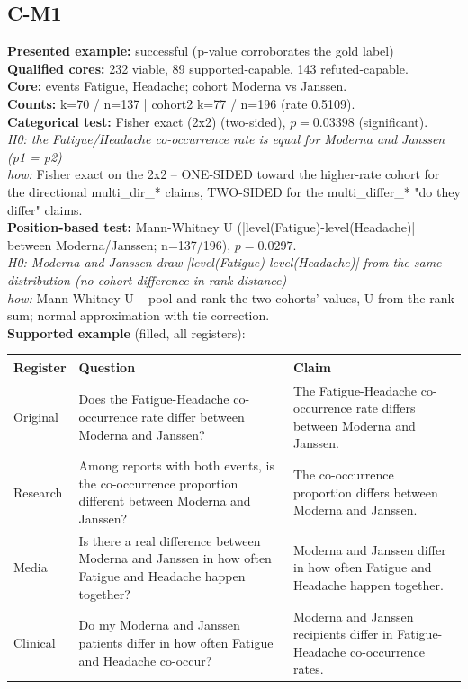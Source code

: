 \documentclass[11pt]{article}
\begin{document}
\subsection*{C-M1}
\textbf{Presented example:} successful (p-value corroborates the gold label) \\
\textbf{Qualified cores:} 232 viable, 89 supported-capable, 143 refuted-capable. \\
\textbf{Core:} events Fatigue, Headache; cohort Moderna vs Janssen. \\
\textbf{Counts:} k=70 / n=137  |  cohort2 k=77 / n=196  (rate 0.5109). \\
\textbf{Categorical test:} Fisher exact (2x2) (two-sided), $p = 0.03398$ (significant). \\
\emph{H0: the Fatigue/Headache co-occurrence rate is equal for Moderna and Janssen (p1 = p2)} \\
\emph{how:} Fisher exact on the 2x2 -- ONE-SIDED toward the higher-rate cohort for the directional multi\_dir\_* claims, TWO-SIDED for the multi\_differ\_* "do they differ" claims. \\
\textbf{Position-based test:} Mann-Whitney U (|level(Fatigue)-level(Headache)| between Moderna/Janssen; n=137/196), $p = 0.0297$. \\
\emph{H0: Moderna and Janssen draw |level(Fatigue)-level(Headache)| from the same distribution (no cohort difference in rank-distance)} \\
\emph{how:} Mann-Whitney U -- pool and rank the two cohorts' values, U from the rank-sum; normal approximation with tie correction. \\
\textbf{Supported example} (filled, all registers): \\
\begin{tabularx}{\linewidth}{@{}l L L@{}}
\toprule
\textbf{Register} & \textbf{Question} & \textbf{Claim} \\
\midrule
Original & Does the Fatigue-Headache co-occurrence rate differ between Moderna and Janssen? & The Fatigue-Headache co-occurrence rate differs between Moderna and Janssen. \\
Research & Among reports with both events, is the co-occurrence proportion different between Moderna and Janssen? & The co-occurrence proportion differs between Moderna and Janssen. \\
Media & Is there a real difference between Moderna and Janssen in how often Fatigue and Headache happen together? & Moderna and Janssen differ in how often Fatigue and Headache happen together. \\
Clinical & Do my Moderna and Janssen patients differ in how often Fatigue and Headache co-occur? & Moderna and Janssen recipients differ in Fatigue-Headache co-occurrence rates. \\
\bottomrule
\end{tabularx}
\vspace{3pt}
\end{document}
